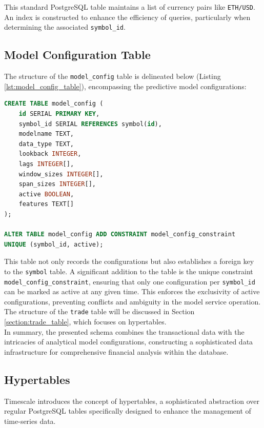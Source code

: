 This standard PostgreSQL table maintains a list of currency pairs like \texttt{ETH/USD}. An index is constructed to enhance the efficiency of queries, particularly when determining the associated \texttt{symbol\_id}.

\subsection{Model Configuration Table}
The structure of the \texttt{model\_config} table is delineated below (Listing \ref{lst:model_config_table}), encompassing the predictive model configurations:

\begin{lstlisting}[language=sql, caption=Model Configuration Table Structure, label=lst:model_config_table]
CREATE TABLE model_config (
    id SERIAL PRIMARY KEY,
    symbol_id SERIAL REFERENCES symbol(id),
    modelname TEXT,
    data_type TEXT,
    lookback INTEGER,
    lags INTEGER[],
    window_sizes INTEGER[],
    span_sizes INTEGER[],
    active BOOLEAN,
    features TEXT[]
);

ALTER TABLE model_config ADD CONSTRAINT model_config_constraint
UNIQUE (symbol_id, active);
\end{lstlisting}

This table not only records the configurations but also establishes a foreign key to the \texttt{symbol} table. A significant addition to the table is the unique constraint \texttt{model\_config\_constraint}, ensuring that only one configuration per \texttt{symbol\_id} can be marked as active at any given time. This enforces the exclusivity of active configurations, preventing conflicts and ambiguity in the model service operation. \\

The structure of the \texttt{trade} table  will be discussed in Section \ref{section:trade_table}, which focuses on hypertables. \\

In summary, the presented schema combines the transactional data with the intricacies of analytical model configurations, constructing a sophisticated data infrastructure for comprehensive financial analysis within the database.

\subsection{Hypertables}
Timescale introduces the concept of hypertables, a sophisticated abstraction over regular PostgreSQL tables specifically designed to enhance the management of time-series data. 

